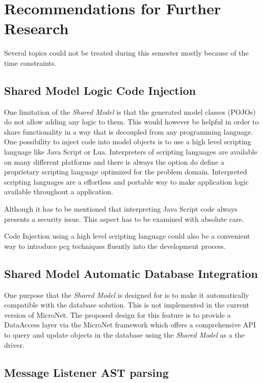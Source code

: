 \section{Recommendations for Further Research}

Several topics could not be treated during this semester mostly because of the
time constraints.

\subsection{Shared Model Logic Code Injection}
\label{sub:model_code_injection}

One limitation of the \textit{Shared Model} is that the generated model classes
(POJOs) do not allow adding any logic to them. This would however be helpful in
order to share functionality in a way that is decoupled from any programming
language. One possibility to inject code into model objects is to use a high
level scripting language like Java Script or Lua. Interpreters of scripting
languages are available on many different platforms and there is always the
option do define a proprietary scripting language optimized for the problem
domain. Interpreted scripting languages are a effortless and portable way to
make application logic available throughout a \ms{} application.

Although it has to be mentioned that interpreting Java Script code always
presents a security issue. This aspect has to be examined with absolute care.

Code Injection using a high level scripting language could also be a convenient
way to introduce \gls{pcg} techniques fluently into the \og{} development
process.

\subsection{Shared Model Automatic Database Integration}

One purpose that the \textit{Shared Model} is designed for is to make it
automatically compatible with the database solution. This is not implemented in
the current version of MicroNet. The proposed design for this feature is to
provide a DataAccess layer via the MicroNet framework which offers a
comprehensive API to query and update objects in the database using the
\textit{Shared Model} as a the driver.

\subsection{Message Listener AST parsing}

